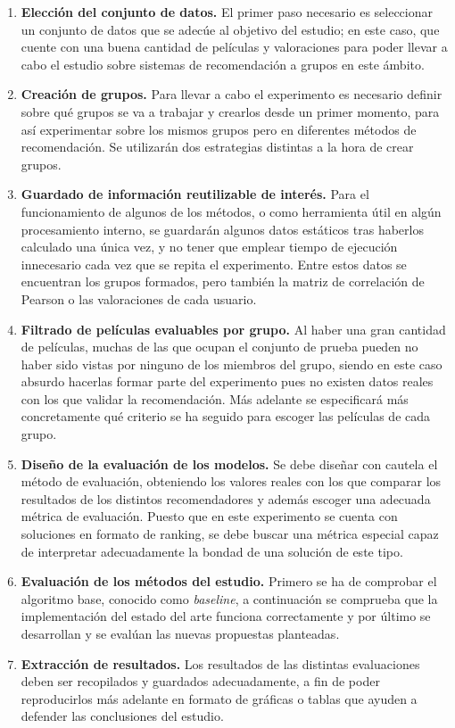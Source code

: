 \begin{enumerate}
	\item \textbf{Elección del conjunto de datos.} El primer paso necesario es seleccionar un conjunto de datos que se adecúe al objetivo del estudio; en este caso, que cuente con una buena cantidad de películas y valoraciones para poder llevar a cabo el estudio sobre sistemas de recomendación a grupos en este ámbito.
	\item \textbf{Creación de grupos.} Para llevar a cabo el experimento es necesario definir sobre qué grupos se va a trabajar y crearlos desde un primer momento, para así experimentar sobre los mismos grupos pero en diferentes métodos de recomendación. Se utilizarán dos estrategias distintas a la hora de crear grupos.
	\item \textbf{Guardado de información reutilizable de interés.} Para el funcionamiento de algunos de los métodos, o como herramienta útil en algún procesamiento interno, se guardarán algunos datos estáticos tras haberlos calculado una única vez, y no tener que emplear tiempo de ejecución innecesario cada vez que se repita el experimento. Entre estos datos se encuentran los grupos formados, pero también la matriz de correlación de Pearson o las valoraciones de cada usuario.
	\item \textbf{Filtrado de películas evaluables por grupo.} Al haber una gran cantidad de películas, muchas de las que ocupan el conjunto de prueba pueden no haber sido vistas por ninguno de los miembros del grupo, siendo en este caso absurdo hacerlas formar parte del experimento pues no existen datos reales con los que validar la recomendación. Más adelante se especificará más concretamente qué criterio se ha seguido para escoger las películas de cada grupo.
	\item \textbf{Diseño de la evaluación de los modelos.} Se debe diseñar con cautela el método de evaluación, obteniendo los valores reales con los que comparar los resultados de los distintos recomendadores y además escoger una adecuada métrica de evaluación. Puesto que en este experimento se cuenta con soluciones en formato de ranking, se debe buscar una métrica especial capaz de interpretar adecuadamente la bondad de una solución de este tipo.
	\item \textbf{Evaluación de los métodos del estudio.} Primero se ha de comprobar el algoritmo base, conocido como \textit{baseline}, a continuación se comprueba que la implementación del estado del arte funciona correctamente y por último se desarrollan y se evalúan las nuevas propuestas planteadas.
	\item \textbf{Extracción de resultados.} Los resultados de las distintas evaluaciones deben ser recopilados y guardados adecuadamente, a fin de poder reproducirlos más adelante en formato de gráficas o tablas que ayuden a defender las conclusiones del estudio.
\end{enumerate}

